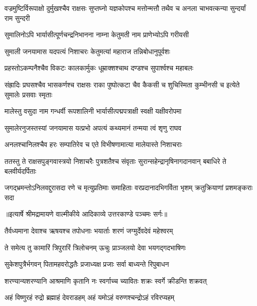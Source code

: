 \threelineshloka
{वज्रमुष्टिर्विरूपाक्षो दुर्मुखश्चैव राक्षसः}
{सुप्तघ्नो यज्ञकोपश्च मत्तोन्मत्तौ तथैव च}
{अनला चाभवत्कन्या सुन्दर्यां राम सुन्दरी} %

\twolineshloka
{सुमालिनोऽपि भार्यासीत्पूर्णचन्द्रनिभानना}
{नाम्ना केतुमती नाम प्राणेभ्योऽपि गरीयसी} %

\twolineshloka
{सुमाली जनयामास यदपत्यं निशाचरः}
{केतुमत्यां महाराज तन्निबोधानुपूर्वशः} %

\twolineshloka
{प्रहस्तोऽकम्पनैश्चैव विकटः कालकार्मुकः}
{धूम्राक्शश्चाथ दण्डश्च सुपार्श्वश्च महाबलः} %

\threelineshloka
{संह्रादिः प्रघसश्चैव भासकर्णश्च राक्षसः}
{राका पुष्पोत्कटा चैव कैकसी च शुचिस्मिता}
{कुम्भीनसी च इत्येते सुमालेः प्रसवाः स्मृताः} %

\twolineshloka
{मालेस्तु वसुदा नाम गन्धर्वी रूपशालिनी}
{भार्यासीत्पद्मपत्राक्षी स्वक्षी यक्षीवरोपमा} %

\twolineshloka
{सुमालेरनुजस्तस्यां जनयामास यत्प्रभो}
{अपत्यं कथ्यमानं तन्मया त्वं शृणु राघव} %

\twolineshloka
{अनलश्चानिलश्चैव हरः सम्पातिरेव च}
{एते विभीषणामात्या मालेयास्ते निशाचराः} %

\fourlineindentedshloka
{ततस्तु ते राक्षसपुङ्गवास्त्रयो}
{निशाचरैः पुत्रशतैश्च संवृताः}
{सुरान्सहेन्द्रानृषिनागदानवान्}
{बबाधिरे ते बलवीर्यदर्पिताः} %

\fourlineindentedshloka
{जगद्भ्रमन्तोऽनिलवद्दुरासदा}
{रणे च मृत्युप्रतिमाः समाहिताः}
{वरप्रदानादभिगर्विता भृशम्}
{क्रतुक्रियाणां प्रशमङ्कराः सदा} %


{॥इत्यार्षे श्रीमद्रामायणे वाल्मीकीये आदिकाव्ये उत्तरकाण्डे पञ्चमः सर्गः॥}


\twolineshloka
{तैर्वध्यमाना देवाश्च ऋषयश्च तपोधनाः}
{भयार्ताः शरणं जग्मुर्देवदेवं महेश्वरम्} %

\twolineshloka
{ते समेत्य तु कामारिं त्रिपुरारिं त्रिलोचनम्}
{ऊचुः प्राञ्जलयो देवा भयगद्गदभाषिणः} %

\twolineshloka
{सुकेशपुत्रैर्भगवन् पितामहवरोद्धतैः}
{प्रजाध्यक्ष प्रजाः सर्वा बाध्यन्ते रिपुबाधन} %

\twolineshloka
{शरण्यान्यशरण्यानि आश्रमाणि कृतानि नः}
{स्वर्गाच्च च्यावितः शक्रः स्वर्गे क्रीडन्ति शक्रवत्} %

\twolineshloka
{अहं विष्णुरहं रुद्रो ब्रह्माहं देवराडहम्}
{अहं यमोऽहं वरुणश्चन्द्रोऽहं रविरप्यहम्} %


